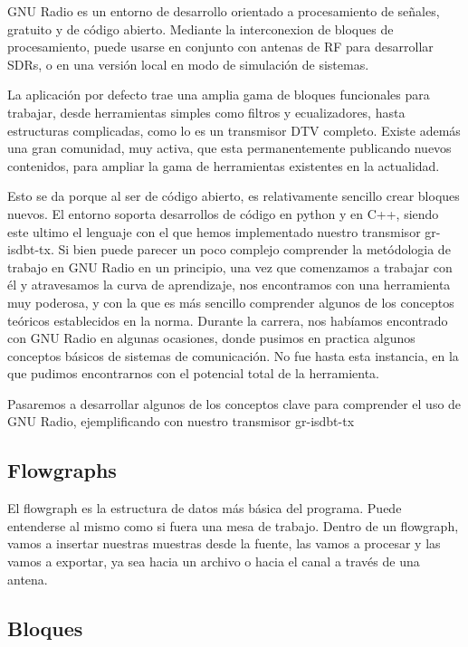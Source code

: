 GNU Radio es un entorno de desarrollo orientado a procesamiento de señales, gratuito y de código abierto. Mediante la interconexion de bloques de procesamiento, puede usarse en conjunto con antenas de RF para desarrollar SDRs, o en una versión local en modo de simulación de sistemas.
 
La aplicación por defecto trae una amplia gama de bloques funcionales para trabajar, desde herramientas simples como filtros y ecualizadores, hasta estructuras complicadas, como lo es un transmisor DTV completo.  Existe además una gran comunidad, muy activa, que esta permanentemente publicando nuevos contenidos, para ampliar la gama de herramientas existentes en la actualidad. 

Esto se da porque al ser de código abierto, es relativamente sencillo crear bloques nuevos. El entorno soporta desarrollos de código en python y en C++, siendo este ultimo el lenguaje con el que hemos implementado nuestro transmisor gr-isdbt-tx. Si bien puede parecer un poco complejo comprender la metódologia de trabajo en GNU Radio en un principio,  una vez que comenzamos a trabajar con él y atravesamos la curva de aprendizaje, nos encontramos con una herramienta muy poderosa, y con la que es más sencillo comprender algunos de los conceptos teóricos establecidos en la norma.
Durante la carrera, nos habíamos encontrado con GNU Radio en algunas ocasiones, donde pusimos en practica algunos conceptos básicos de sistemas de comunicación. No fue hasta esta instancia, en la que pudimos encontrarnos con el potencial total de la herramienta. 

Pasaremos a desarrollar algunos de los conceptos clave para comprender el uso de GNU Radio, ejemplificando con nuestro transmisor gr-isdbt-tx

\subsection{Flowgraphs}

El flowgraph es la estructura de datos más básica del programa. Puede entenderse al mismo como si fuera una mesa de trabajo. Dentro de un flowgraph, vamos a insertar nuestras muestras desde la fuente, las vamos a procesar y las vamos a exportar, ya sea hacia un archivo o hacia el canal a través de una antena. 

\subsection{Bloques}

